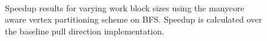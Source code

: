 \begin{figure}[h]
    \centering
     \\
    \caption{Speedup results for varying work block sizes using the manycore aware vertex partitioning scheme on BFS. Speedup is calculated over the baseline pull direction implementation.}
    \label{pap:generals:sec:eval:fig:cache}
\end{figure}

